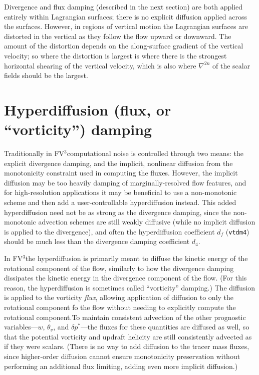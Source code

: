 \documentclass[12pt,letterpaper]{book}
\newcommand{\fv}{FV$^{\mathrm{3}}$}
\begin{document}
Divergence and flux damping (described in the next section) are both applied entirely within Lagrangian surfaces; there is no explicit diffusion applied across the surfaces. However, in regions of vertical motion the Lagrangian surfaces are distorted in the vertical as they follow the flow upward or downward. The amount of the distortion depends on the along-surface gradient of the vertical velocity; so where the distortion is largest is where there is the strongest horizontal shearing of the vertical velocity, which is also where $\nabla^{2n}$ of the scalar fields should be the largest. 

\section{Hyperdiffusion (flux, or ``vorticity'') damping}

Traditionally in \fv computational noise is controlled through two means: the explicit divergence damping, and the implicit, nonlinear diffusion from the monotonicity constraint used in computing the fluxes. However, the implicit diffusion may be too heavily damping of marginally-resolved flow features, and for high-resolution applications it may be beneficial to use a non-monotonic scheme and then add a user-controllable hyperdiffusion instead. This added hyperdiffusion need not be as strong as the divergence damping, since the non-monotonic advection schemes are still weakly diffusive (while no implicit diffusion is applied to the divergence), and often the hyperdiffusion coefficient $d_f$ (\texttt{vtdm4}) should be much less than the divergence damping coefficient $d_4$.

In \fv the hyperdiffusion is primarily meant to diffuse the kinetic energy of the rotational component of the flow, similarly to how the divergence damping dissipates the kinetic energy in the divergence component of the flow. (For this reason, the hyperdiffusion is sometimes called ``vorticity'' damping.) The diffusion is applied to the vorticity \textit{flux}, allowing application of diffusion to only the rotational component fo the flow without needing to explicitly compute the rotational component.To maintain consistent advection of the other prognostic variables---$w$, $\theta_v$, and $\delta p^*$---the fluxes for these quantities are diffused as well, so that the potential vorticity and updraft helicity are still consistently advected as if they were scalars. (There is no way to add diffusion to the tracer mass fluxes, since higher-order diffusion cannot ensure monotonicity preservation without performing an additional flux limiting, adding even more implicit diffusion.)
\end{document}
